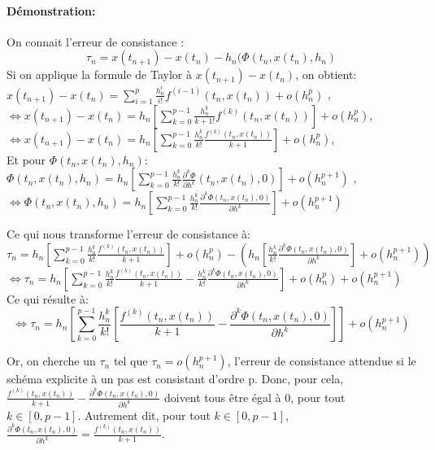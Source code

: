 \documentclass[a4paper,12pt,landscape]{article}
\begin{document}
\paragraph{Démonstration:} On connait l'erreur de consistance :
\begin{equation}
\tau_n = x(t_{n+1})-x(t_{n})-h_n( \Phi (t_n, x(t_n),h_n)
\end{equation} 
Si on applique la formule de Taylor à $x(t_{n+1})-x(t_n)$, on obtient:\\
$x(t_{n+1})-x(t_n)=\sum^{p}_{i=1} \frac{h_{n}^{i}}{i!} f^{(i-1)} (t_n,x(t_{n}))+ o(h^p_n)$ ,\\
$\Leftrightarrow x(t_{n+1})-x(t_n) = h_n [\sum^{p-1}_{k=0} \frac{h_{n}^{k}}{k+1!} f^{(k)} (t_n,x(t_{n}))] + o(h^p_n)$,\\
$\Leftrightarrow x(t_{n+1})-x(t_n) = h_n [\sum^{p-1}_{k=0} \frac{h_{n}^{k}}{k!} \frac{f^{(k)} (t_n,x(t_{n}))}{k+1}] + o(h^p_n)$,\\
Et pour $\Phi (t_n,x(t_n),h_n)$:\\
$\Phi (t_n,x(t_n),h_n)=h_n [\sum^{p-1}_{k=0} \frac{h_{n}^{k}}{k!} \frac{\partial^{k} \Phi}{\partial h^{k}} (t_n,x(t_{n}),0)]+ o(h^{p+1}_n)$ ,\\
$\Leftrightarrow \Phi (t_n,x(t_n),h_n)=h_n [\sum^{p-1}_{k=0} \frac{h_{n}^{k}}{k!} \frac{\partial^{k} \Phi (t_n,x(t_{n}),0)}{\partial h^{k}} ]+ o(h^{p+1}_n)$

Ce qui nous transforme l'erreur de consistance à:\\
$\tau_n = h_n [\sum^{p-1}_{k=0} \frac{h_{n}^{k}}{k!} \frac{f^{(k)} (t_n,x(t_{n}))}{k+1}] + o(h^p_n) - (h_n [\frac{h_{n}^{k}}{k!} \frac{\partial^{k} \Phi (t_n,x(t_{n}),0)}{\partial h^{k}} ] + o(h^{p+1}_n))$\\
$\Leftrightarrow \tau_n = h_n [\sum^{p-1}_{k=0} \frac{h_{n}^{k}}{k!} \frac{f^{(k)} (t_n,x(t_{n}))}{k+1} - \frac{h_{n}^{k}}{k!} \frac{\partial^{k} \Phi (t_n,x(t_{n}),0)}{\partial h^{k}}] + o(h^p_n)+ o(h^{p+1}_n)$\\

Ce qui résulte à:
\begin{equation}
\Leftrightarrow \tau_n = h_n [\sum^{p-1}_{k=0} \frac{h_{n}^{k}}{k!} [\frac{f^{(k)} (t_n,x(t_{n}))}{k+1} - \frac{\partial^{k} \Phi (t_n,x(t_{n}),0)}{\partial h^{k}}]] + o(h^{p+1}_n)
\end{equation}

Or, on cherche un $\tau_n$ tel que $\tau_n = o(h^{p+1}_n)$, l'erreur de consistance attendue si le schéma explicite à un pas est consistant d’ordre p. 
Donc, pour cela, $\frac{f^{(k)} (t_n,x(t_{n}))}{k+1} - \frac{\partial^{k} \Phi (t_n,x(t_{n}),0)}{\partial h^{k}}$ doivent tous être égal à $0$, pour tout $k \in [0,p-1]$.
Autrement dit, pour tout $k \in [0,p-1]$, $\frac{\partial^{k} \Phi (t_n,x(t_{n}),0)}{\partial h^{k}} = \frac{f^{(k)} (t_n,x(t_{n}))}{k+1} $.\\
\end{document}
